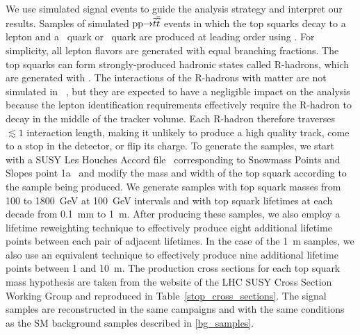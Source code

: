 We use simulated signal events to guide the analysis strategy and interpret our results. Samples of simulated $\mathrm{p}\mathrm{p} {\to} \widetilde{t} \overline{\widetilde{t}}$ events in which the top squarks decay to a lepton and a \cPqb\ quark or \cPqd\ quark are produced at leading order using . For simplicity, all lepton flavors are generated with equal branching fractions. The top squarks can form strongly-produced hadronic states called R-hadrons, which are generated with \PYTHIA. The interactions of the R-hadrons with matter are not simulated in \GEANTfour~\cite{geant4}, but they are expected to have a negligible impact on the analysis because the lepton identification requirements effectively require the R-hadron to decay in the middle of the tracker volume. Each R-hadron therefore traverses $\lesssim1$ interaction length, making it unlikely to produce a high quality track, come to a stop in the detector, or flip its charge. To generate the samples, we start with a SUSY Les Houches Accord file~\cite{LesHouches} corresponding to Snowmass Points and Slopes point 1a~\cite{snowmass_points_slopes} and modify the mass and width of the top squark according to the sample being produced. We generate samples with top squark masses from \num{100} to \SI{1800}{\GeV} at \SI{100}{\GeV} intervals and with top squark lifetimes at each decade from \SI{0.1}{\mm} to \SI{1}{m}. After producing these samples, we also employ a lifetime reweighting technique to effectively produce eight additional lifetime points between each pair of adjacent lifetimes. In the case of the 1~m samples, we also use an equivalent technique to effectively produce nine additional lifetime points between \num{1} and \SI{10}{\m}. The production cross sections for each top squark mass hypothesis are taken from the website of the LHC SUSY Cross Section Working Group and reproduced in Table~\ref{stop_cross_sections}. The signal samples are reconstructed in the same campaigns and with the same conditions as the SM background samples described in \ref{bg_samples}.




\pagebreak